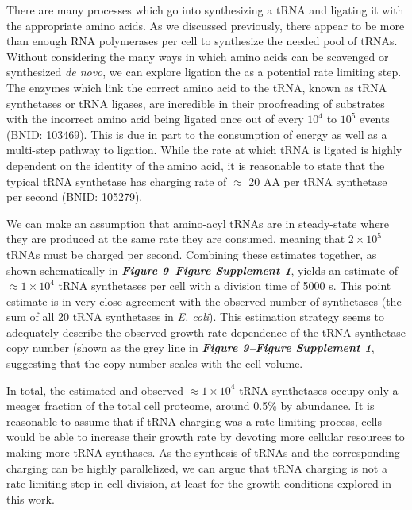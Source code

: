 There are many processes which go into synthesizing a tRNA and ligating it
with the appropriate amino acids. As we discussed previously, there appear to
be more than enough RNA polymerases per cell to synthesize the needed pool of
tRNAs. Without considering the many ways in which amino acids can be
scavenged or synthesized \textit{de novo}, we can explore ligation the as a
potential rate limiting step. The enzymes which link the correct amino acid
to the tRNA, known as tRNA synthetases or tRNA ligases, are incredible in
their proofreading of substrates with the incorrect amino acid being ligated
once out of every $10^4$ to $10^5$ events (BNID: 103469). This is due in part
to the consumption of energy as well as a multi-step pathway to ligation.
While the rate at which tRNA is ligated is highly dependent on the identity
of the amino acid, it is reasonable to state that the typical tRNA synthetase
has charging rate of $\approx$ 20 AA per tRNA synthetase per second (BNID:
105279).

We can make an assumption that amino-acyl tRNAs are in steady-state where
they are produced at the same rate they are consumed, meaning that $2 \times
10^5$ tRNAs must be charged per second. Combining these estimates together,
as shown schematically in \textbf{\textit{Figure 9–Figure Supplement 1}}, yields an estimate of $\approx 1\times 10^{4}$
tRNA synthetases per cell with a division time of 5000 s. This point estimate
is in very close agreement with the observed number of synthetases (the sum
of all 20 tRNA synthetases in \textit{E. coli}). This estimation strategy
seems to adequately describe the observed growth rate dependence of the tRNA
synthetase copy number (shown as the grey line in \textbf{\textit{Figure 9–Figure Supplement 1}}, suggesting
that the copy number scales with the cell volume.

In total, the estimated and observed $\approx 1\times 10^{4}$ tRNA synthetases occupy
only a meager fraction of the total cell proteome, around 0.5\% by abundance.
It is reasonable to assume that if tRNA charging was a rate limiting process,
cells would be able to increase their growth rate by devoting more cellular
resources to making more tRNA synthases. As the synthesis of tRNAs and the
corresponding charging can be highly parallelized, we can argue that tRNA
charging is not a rate limiting step in cell division, at least for the
growth conditions explored in this work.

